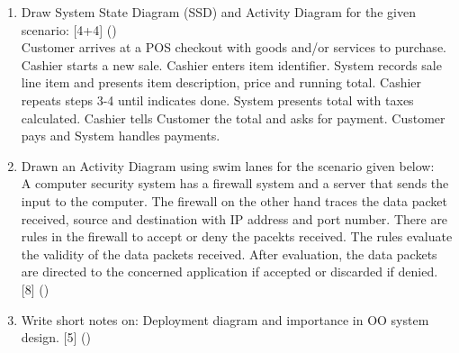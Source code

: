 \documentclass[12pt]{article}
\begin{document}
\begin{enumerate}
      \item Draw System State Diagram (SSD) and Activity Diagram for the given scenario: \hfill [4+4] ()\\
        Customer arrives at a POS checkout with goods and/or services to purchase. Cashier starts a new sale. Cashier enters item identifier. System records sale line item and presents item description, price and running total. Cashier repeats steps 3-4 until indicates done. System presents total with taxes calculated. Cashier tells Customer the total and asks for payment. Customer pays and System handles payments.

      \item Drawn an Activity Diagram using swim lanes for the scenario given below:\\
        A computer security system has a firewall system and a server that sends the input to the computer. The firewall on the other hand traces the data packet received, source and destination with IP address and port number. There are rules in the firewall to accept or deny the pacekts received. The rules evaluate the validity of the data packets received. After evaluation, the data packets are directed to the concerned application if accepted or discarded if denied. \hfill [8] ()

      \item Write short notes on: Deployment diagram and importance in OO system design. \hfill [5] ()
    \end{enumerate}
\end{document}

